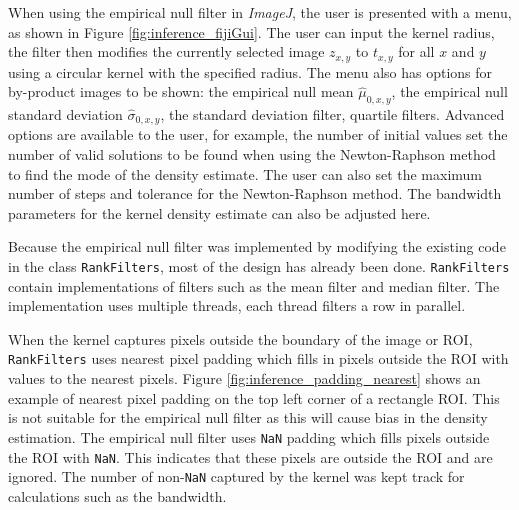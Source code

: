 When using the empirical null filter in \emph{ImageJ}, the user is presented with a menu, as shown in Figure \ref{fig:inference_fijiGui}. The user can input the kernel radius, the filter then modifies the currently selected image $z_{x,y}$ to $t_{x,y}$ for all $x$ and $y$ using a circular kernel with the specified radius. The menu also has options for by-product images to be shown: the empirical null mean $\widehat{\mu}_{0,x,y}$, the empirical null standard deviation $\widehat{\sigma}_{0,x,y}$, the standard deviation filter, quartile filters. Advanced options are available to the user, for example, the number of initial values set the number of valid solutions to be found when using the Newton-Raphson method to find the mode of the density estimate. The user can also set the maximum number of steps and tolerance for the Newton-Raphson method. The bandwidth parameters for the kernel density estimate can also be adjusted here.

Because the empirical null filter was implemented by modifying the existing code in the class \texttt{RankFilters}, most of the design has already been done. \texttt{RankFilters} contain implementations of filters such as the mean filter and median filter. The implementation uses multiple threads, each thread filters a row in parallel.

When the kernel captures pixels outside the boundary of the image or ROI, \texttt{RankFilters} uses nearest pixel padding which fills in pixels outside the ROI with values to the nearest pixels. Figure \ref{fig:inference_padding_nearest} shows an example of nearest pixel padding on the top left corner of a rectangle ROI. This is not suitable for the empirical null filter as this will cause bias in the density estimation. The empirical null filter uses \texttt{NaN} padding which fills pixels outside the ROI with \texttt{NaN}. This indicates that these pixels are outside the ROI and are ignored. The number of non-\texttt{NaN} captured by the kernel was kept track for calculations such as the bandwidth.

